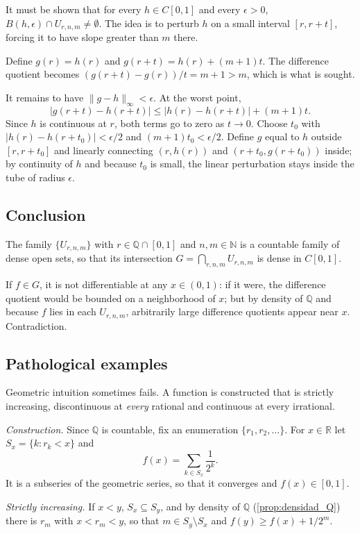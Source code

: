 \documentclass[11pt, a4paper]{article}
\begin{document}
It must be shown that for every $h \in C[0,1]$ and every $\epsilon > 0$,
$B(h, \epsilon) \cap U_{r,n,m} \ne \emptyset$. The idea is to perturb $h$ on a small interval
$[r, r+t]$, forcing it to have slope greater than $m$ there.

Define $g(r) = h(r)$ and $g(r+t) = h(r) + (m+1)t$. The difference quotient becomes
$(g(r+t) - g(r))/t = m+1 > m$, which is what is sought.

It remains to have $\|g - h\|_\infty < \epsilon$. At the worst point,
$$ |g(r+t) - h(r+t)| \le |h(r) - h(r+t)| + (m+1)t. $$
Since $h$ is continuous at $r$, both terms go to zero as $t \to 0$. Choose $t_0$ with
$|h(r) - h(r+t_0)| < \epsilon/2$ and $(m+1)t_0 < \epsilon/2$. Define $g$ equal to $h$ outside
$[r, r+t_0]$ and linearly connecting $(r, h(r))$ and $(r+t_0, g(r+t_0))$ inside; by continuity of
$h$ and because $t_0$ is small, the linear perturbation stays inside the tube of radius $\epsilon$.

\subsection*{Conclusion}

The family $\{U_{r,n,m}\}$ with $r \in \mathbb{Q} \cap [0,1]$ and $n, m \in \mathbb{N}$ is a countable family of
dense open sets, so that its intersection $G = \bigcap_{r, n, m} U_{r,n,m}$ is dense in $C[0,1]$.

If $f \in G$, it is not differentiable at any $x \in (0,1)$: if it were, the difference quotient
would be bounded on a neighborhood of $x$; but by density of $\mathbb{Q}$ and because $f$ lies in each
$U_{r,n,m}$, arbitrarily large difference quotients appear near $x$. Contradiction.

\subsection{Pathological examples}

Geometric intuition sometimes fails. A function is constructed that is strictly
increasing, discontinuous at \emph{every} rational and continuous at every irrational.

\textit{Construction.} Since $\mathbb{Q}$ is countable, fix an enumeration
$\{r_1, r_2, \dots\}$. For $x \in \mathbb{R}$ let $S_x = \{k : r_k < x\}$ and
$$ f(x) = \sum_{k \in S_x} \frac{1}{2^k}. $$
It is a subseries of the geometric series, so that it converges and $f(x) \in [0, 1]$.

\textit{Strictly increasing.} If $x < y$, $S_x \subseteq S_y$, and by density of $\mathbb{Q}$
(\ref{prop:densidad_Q}) there is $r_m$ with $x < r_m < y$, so that $m \in S_y \setminus S_x$ and
$f(y) \ge f(x) + 1/2^m$.
\end{document}
